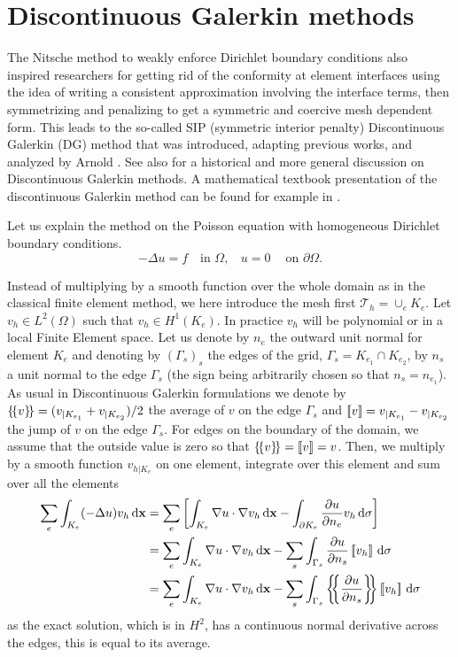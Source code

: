 \section{Discontinuous Galerkin methods}

The Nitsche method to weakly enforce Dirichlet boundary conditions also inspired researchers for getting rid of the conformity at element interfaces using the idea of writing a consistent approximation involving the interface terms, then symmetrizing and penalizing to get a symmetric and coercive mesh dependent form. This leads to the so-called SIP (symmetric interior penalty) Discontinuous Galerkin (DG) method that was introduced, adapting previous works, and analyzed by Arnold \cite{arnold1982}. See also \cite{arnold2002} for a historical and more general discussion on Discontinuous Galerkin methods. A mathematical textbook presentation of the discontinuous Galerkin method can be found for example in \cite{dipietro2012}.

Let us explain the method on the Poisson equation with homogeneous Dirichlet boundary conditions.
$$-\Delta u= f ~~~ \mbox{ in } \Omega, ~~~~ u=0 ~~~~\mbox{ on } \partial \Omega.$$



Instead of multiplying by a smooth function over the whole domain as in the classical finite element method, we here introduce the mesh first $\mathcal{T}_h= \cup_e K_e$. Let $v_h\in L^2(\Omega)$ such that $v_h\in H^1(K_e)$. In practice $v_h$  will be polynomial or in a local Finite Element space. Let us denote by $n_e$ the outward unit normal for element $K_e$ and denoting by
$(\Gamma_s)_s$ the edges of the grid, $\Gamma_s=K_{e_1}\cap K_{e_2}$, by $n_s$ a unit normal to the edge $\Gamma_s$ (the sign being arbitrarily chosen so that $n_s=n_{e_1}$). As usual in Discontinuous Galerkin formulations we denote by
$\left\{ \!\left\{ v \right\} \! \right\}= (v_{|K_{e_1}} + v_{|K_{e_2}})/2$ the average of $v$ on the edge $\Gamma_s$ and
$\left[ \!\left[ v \right]\! \right]= v_{|K_{e_1}} - v_{|K_{e_2}}$ the jump of $v$ on the edge $\Gamma_s$. For edges on the boundary of the domain, we assume that the outside value is zero so that $\left\{ \!\left\{ v \right\} \! \right\} = \left[ \!\left[ v \right]\! \right]= v$. Then, we multiply by a smooth function $v_{h|K_e}$ on one element, integrate over this element and sum over all the elements
\begin{align}
\sum_e \int_{K_e} (-\Delta u) v_h \dd \mathbf{x} &=  
\sum_e  \left[ \int_{K_e}\nabla u \cdot \nabla v_h \dd \mathbf{x} 
-  \int_{\partial{K_e}} \fracp{u}{n_e}  v_h \dd \sigma  \right] \nonumber\\
&=  
\sum_e  \int_{K_e}\nabla u \cdot \nabla v_h \dd \mathbf{x} 
- \sum_s  \int_{\Gamma_s}\fracp{u}{n_s}\ljump v_h \rjump \dd \sigma  \nonumber\\
&= \sum_e  \int_{K_e}\nabla u \cdot \nabla v_h \dd \mathbf{x} 
- \sum_s  \int_{\Gamma_s}\lbav \fracp{u}{n_s}\rbav\ljump v_h \rjump \dd \sigma 
\label{eq:sip_consist}
\end{align}
as the exact solution, which is in $H^2$, has a continuous normal derivative across the edges, this is equal to its average.

